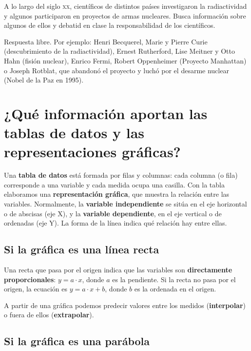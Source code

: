 \begin{exercise}
    A lo largo del siglo \textsc{xx}, científicos de distintos países investigaron la radiactividad y algunos participaron en proyectos de armas nucleares. Busca información sobre algunos de ellos y debatid en clase la responsabilidad de los científicos.
    \begin{solu}
        Respuesta libre. Por ejemplo: Henri Becquerel, Marie y Pierre Curie (descubrimiento de la radiactividad), Ernest Rutherford, Lise Meitner y Otto Hahn (fisión nuclear), Enrico Fermi, Robert Oppenheimer (Proyecto Manhattan) o Joseph Rotblat, que abandonó el proyecto y luchó por el desarme nuclear (Nobel de la Paz en 1995).
    \end{solu}
\end{exercise}

\section[Tablas de datos y gráficas]{¿Qué información aportan las tablas de datos y las representaciones gráficas?}

Una \textbf{tabla de datos} está formada por filas y columnas: cada columna (o fila) corresponde a una variable y cada medida ocupa una casilla. Con la tabla elaboramos una \textbf{representación gráfica}, que muestra la relación entre las variables. Normalmente, la \textbf{variable independiente} se sitúa en el eje horizontal o de abscisas (eje X), y la \textbf{variable dependiente}, en el eje vertical o de ordenadas (eje Y). La forma de la línea indica qué relación hay entre ellas.

\subsection{Si la gráfica es una línea recta}

Una recta que pasa por el origen indica que las variables son \textbf{directamente proporcionales}: \(y = a \cdot x\), donde \(a\) es la pendiente. Si la recta no pasa por el origen, la ecuación es \(y = a \cdot x + b\), donde \(b\) es la ordenada en el origen.

A partir de una gráfica podemos predecir valores entre los medidos (\textbf{interpolar}) o fuera de ellos (\textbf{extrapolar}).

\subsection{Si la gráfica es una parábola}

